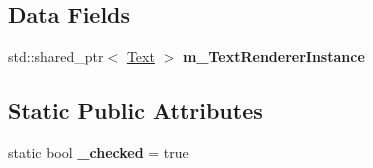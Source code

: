 \subsection*{Data Fields}
\begin{DoxyCompactItemize}
\item 
std\+::shared\+\_\+ptr$<$ \hyperlink{class_text}{Text} $>$ {\bfseries m\+\_\+\+Text\+Renderer\+Instance}\hypertarget{class_check_box_a89248e9f2d0168a99e480e2847f0b96b}{}\label{class_check_box_a89248e9f2d0168a99e480e2847f0b96b}

\end{DoxyCompactItemize}
\subsection*{Static Public Attributes}
\begin{DoxyCompactItemize}
\item 
static bool {\bfseries \+\_\+checked} = true\hypertarget{class_check_box_aaf46b8d854583decd71d82af3a84cd4c}{}\label{class_check_box_aaf46b8d854583decd71d82af3a84cd4c}

\end{DoxyCompactItemize}
